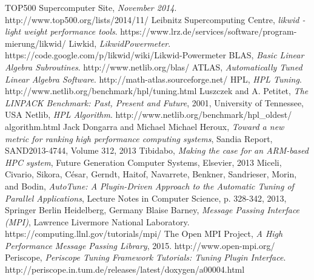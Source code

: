 \documentclass[10pt,twocolumn]{article}
\begin{document}
\begin{thebibliography}{9}

  	TOP500 Supercomputer Site,
  	\emph{November 2014}.
  	http://www.top500.org/lists/2014/11/
	Leibnitz Supercomputing Centre,
	\emph{likwid - light weight performance tools}.
	https://www.lrz.de/services/software/program-mierung/likwid/
	Liwkid,
	\emph{LikwidPowermeter}.
	https://code.google.com/p/likwid/wiki/Likwid-Powermeter
	BLAS,
	\emph{Basic Linear Algebra Subroutines}.
	http://www.netlib.org/blas/
	ATLAS,
	\emph{Automatically Tuned Linear Algebra Software}.
	http://math-atlas.sourceforge.net/
	HPL,
	\emph{HPL Tuning}.
	http://www.netlib.org/benchmark/hpl/tuning.html
	Luszczek and A. Petitet,
	\emph{The LINPACK Benchmark: Past, Present and Future},
	2001, University of Tennessee, USA
	Netlib,
	\emph{HPL Algorithm}.
	http://www.netlib.org/benchmark/hpl\_oldest/ algorithm.html
	Jack Dongarra and Michael Michael Heroux,
	\emph{Toward a new metric for ranking high performance computing systems},
	Sandia Report, SAND2013-4744, Volume 312, 2013
	Tibidabo,
	\emph{Making the case for an ARM-based HPC system},
	Future Generation Computer Systems, Elsevier, 2013
	Miceli, Civario, Sikora, César, Gerndt, Haitof, Navarrete, Benkner, Sandrieser, Morin, and Bodin,
	\emph{AutoTune: A Plugin-Driven Approach to the Automatic Tuning of Parallel Applications}, Lecture Notes in Computer Science, p. 328-342, 2013, Springer Berlin Heidelberg, Germany
	Blaise Barney,
	\emph{Message Passing Interface (MPI)},
	Lawrence Livermore National Laboratory.
	https://computing.llnl.gov/tutorials/mpi/
	The Open MPI Project,
	\emph{A High Performance Message Passing Library}, 2015.
	http://www.open-mpi.org/
	Periscope,
	\emph{Periscope Tuning Framework Tutorials: Tuning Plugin Interface}.
	http://periscope.in.tum.de/releases/latest/doxygen/a00004.html
\end{thebibliography}
\end{document}
